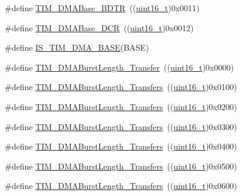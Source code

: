 \begin{DoxyCompactItemize}
\item 
\#define \hyperlink{group___t_i_m___d_m_a___base__address_gaaff22bbf3091c47783c1c68b648c8605}{T\+I\+M\+\_\+\+D\+M\+A\+Base\+\_\+\+B\+D\+TR}~((\hyperlink{_p_e___types_8h_a1f1825b69244eb3ad2c7165ddc99c956}{uint16\+\_\+t})0x0011)
\item 
\#define \hyperlink{group___t_i_m___d_m_a___base__address_ga59e2206e4e03b9d55c9fb5a24e29b01c}{T\+I\+M\+\_\+\+D\+M\+A\+Base\+\_\+\+D\+CR}~((\hyperlink{_p_e___types_8h_a1f1825b69244eb3ad2c7165ddc99c956}{uint16\+\_\+t})0x0012)
\item 
\#define \hyperlink{group___t_i_m___d_m_a___base__address_gaf565551f2619b1368fed7ef1ba7414de}{I\+S\+\_\+\+T\+I\+M\+\_\+\+D\+M\+A\+\_\+\+B\+A\+SE}(B\+A\+SE)
\item 
\#define \hyperlink{group___t_i_m___d_m_a___burst___length_gab87f91f1c5583b9888cb6bb37fc639e2}{T\+I\+M\+\_\+\+D\+M\+A\+Burst\+Length\+\_\+Transfer}~((\hyperlink{_p_e___types_8h_a1f1825b69244eb3ad2c7165ddc99c956}{uint16\+\_\+t})0x0000)
\item 
\#define \hyperlink{group___t_i_m___d_m_a___burst___length_ga829504c3e8c90a9445f6a223bc3034f8}{T\+I\+M\+\_\+\+D\+M\+A\+Burst\+Length\+\_\+Transfers}~((\hyperlink{_p_e___types_8h_a1f1825b69244eb3ad2c7165ddc99c956}{uint16\+\_\+t})0x0100)
\item 
\#define \hyperlink{group___t_i_m___d_m_a___burst___length_ga3a99863a0925e0cc9a11b91aade66f11}{T\+I\+M\+\_\+\+D\+M\+A\+Burst\+Length\+\_\+Transfers}~((\hyperlink{_p_e___types_8h_a1f1825b69244eb3ad2c7165ddc99c956}{uint16\+\_\+t})0x0200)
\item 
\#define \hyperlink{group___t_i_m___d_m_a___burst___length_ga84bfeb309593a1ac580e233bf7514b36}{T\+I\+M\+\_\+\+D\+M\+A\+Burst\+Length\+\_\+Transfers}~((\hyperlink{_p_e___types_8h_a1f1825b69244eb3ad2c7165ddc99c956}{uint16\+\_\+t})0x0300)
\item 
\#define \hyperlink{group___t_i_m___d_m_a___burst___length_ga44f8aa51fbe8887a5f3c37a0e776902c}{T\+I\+M\+\_\+\+D\+M\+A\+Burst\+Length\+\_\+Transfers}~((\hyperlink{_p_e___types_8h_a1f1825b69244eb3ad2c7165ddc99c956}{uint16\+\_\+t})0x0400)
\item 
\#define \hyperlink{group___t_i_m___d_m_a___burst___length_ga8be40a21654eea72e9c1bf9922675b22}{T\+I\+M\+\_\+\+D\+M\+A\+Burst\+Length\+\_\+Transfers}~((\hyperlink{_p_e___types_8h_a1f1825b69244eb3ad2c7165ddc99c956}{uint16\+\_\+t})0x0500)
\item 
\#define \hyperlink{group___t_i_m___d_m_a___burst___length_gaf2ae83bd73b0e92b73e5ebfc11f9bfad}{T\+I\+M\+\_\+\+D\+M\+A\+Burst\+Length\+\_\+Transfers}~((\hyperlink{_p_e___types_8h_a1f1825b69244eb3ad2c7165ddc99c956}{uint16\+\_\+t})0x0600)

\end{DoxyCompactItemize}
